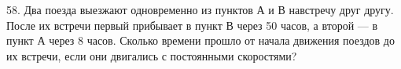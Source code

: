 58. Два поезда выезжают одновременно из пунктов А и В навстречу друг другу. После их встречи первый прибывает в пункт В через 50 часов, а второй --- в пункт А через 8 часов. Сколько времени прошло от начала движения поездов до их встречи, если они двигались с постоянными скоростями?\\
